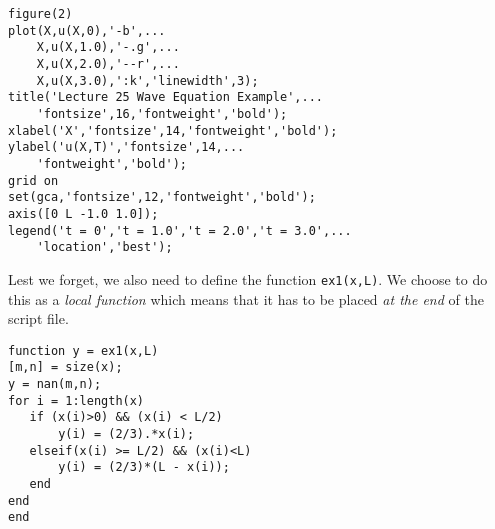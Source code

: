 \begin{lstlisting}[style=myMatlab, name=lec25-ex2]
%% fixed plot, multiple data series
figure(2)
plot(X,u(X,0),'-b',...
    X,u(X,1.0),'-.g',...
    X,u(X,2.0),'--r',...
    X,u(X,3.0),':k','linewidth',3);
title('Lecture 25 Wave Equation Example',...
    'fontsize',16,'fontweight','bold');
xlabel('X','fontsize',14,'fontweight','bold');
ylabel('u(X,T)','fontsize',14,...
    'fontweight','bold');
grid on
set(gca,'fontsize',12,'fontweight','bold');
axis([0 L -1.0 1.0]);
legend('t = 0','t = 1.0','t = 2.0','t = 3.0',...
    'location','best');
\end{lstlisting}

\vspace{1.0cm}

\noindent Lest we forget, we also need to define the function \lstinline[style=myMatlab]{ex1(x,L)}.  We choose to do this as a \emph{local function} which means that it has to be placed \emph{at the end} of the script file.

\begin{lstlisting}[style=myMatlab, name=lec25-ex2]
%% Local functions
function y = ex1(x,L)
[m,n] = size(x);
y = nan(m,n);
for i = 1:length(x)
   if (x(i)>0) && (x(i) < L/2)
       y(i) = (2/3).*x(i);
   elseif(x(i) >= L/2) && (x(i)<L)
       y(i) = (2/3)*(L - x(i));
   end
end
end
\end{lstlisting}
